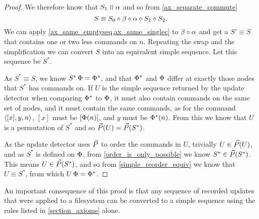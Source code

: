 \begin{proof}
We therefore know that $S_1\mathrel{\wr\wr}\alpha$ and so
from \cref{ax_separate_commute}
\[ S \equiv S_0\circ\beta\circ\alpha\circ S_1 \circ S_2. \]
We can apply \cref{ax_same_emptyseq,ax_same_singlec} to
$\beta\circ\alpha$ and get a $S'\equiv S$ that contains one or two less commands on $n$.
Repeating the swap and the simplification we
can convert $S$ into an equivalent simple sequence.
Let this sequence be $S^*$.

As $S^*\equiv S$, we know $S^*\,\Phi=\Phi^*$, and that
$\Phi^*$ and $\Phi$ differ at exactly those nodes that $S^*$ has commands on.
If $U$ is the simple sequence returned by the update detector
when comparing $\Phi^*$ to $\Phi$, it must also contain commands on the same set of nodes,
and it must contain the same commands,
as for the command $\langle{[x],y,n}\rangle$, $[x]$ must be $[\Phi(n)]$, and $y$ must be $\Phi^*(n)$.
From this we know that $U$ is a permutation of $S^*$ and so $\vec{P}({U})=\vec{P}({S^*})$.

As the update detector uses $\vec{P}$ to order the commands in $U$,
trivially $U\in\vec{P}({U})$,
and as $S^*$ is defined on $\Phi$,
from \cref{order_is_only_possible} we know $S^* \in \vec{P}({S^*})$.
This means $U\in\vec{P}({S^*})$,
and so from \cref{simple_reorder_equiv} we know that $U\equiv S^*$,
from which $U\,\Phi=\Phi^*$.
\end{proof}

An important consequence of this proof is that any sequence
of recorded updates that were applied to a filesystem can be
converted to a simple sequence using the rules listed in
\cref{section_axioms} alone.
